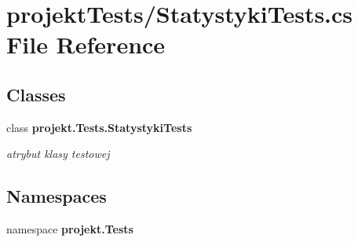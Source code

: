 \section{projekt\+Tests/\+Statystyki\+Tests.cs File Reference}
\label{StatystykiTests_8cs}
\subsection*{Classes}
\begin{DoxyCompactItemize}
\item 
class \textbf{ projekt.\+Tests.\+Statystyki\+Tests}
\begin{DoxyCompactList}\small\item\em atrybut klasy testowej \end{DoxyCompactList}\end{DoxyCompactItemize}
\subsection*{Namespaces}
\begin{DoxyCompactItemize}
\item 
namespace \textbf{ projekt.\+Tests}
\end{DoxyCompactItemize}
